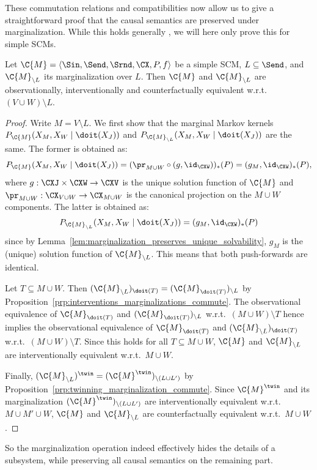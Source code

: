 These commutation relations and compatibilities now allow us to give a straightforward proof that
the causal semantics are preserved under marginalization.
While this holds generally \cite{BFPM21}, we will here only prove this for simple SCMs.
\begin{Thm}\label{Thm:various_equiv_marginalization}
  Let $\C{M} = \langle \Sin, \Send, \Srnd, \CX, P, f \rangle$ be a simple SCM, $L \subseteq \Send$, and
  $\C{M}_{\setminus L}$ its marginalization over $L$. Then $\C{M}$ and $\C{M}_{\setminus L}$ are observationally,
  interventionally and counterfactually equivalent w.r.t.\ $(V \cup W) \setminus L$.
\end{Thm}
\begin{proof}
  Write $M = V \setminus L$.
  We first show that the marginal Markov kernels $P_{\C{M}}(X_M,X_W \mid \doit(X_J))$ and $P_{\C{M}_{\setminus L}}(X_M,X_W \mid \doit(X_J))$ are the same.
  The former is obtained as:
  $$P_{\C{M}}(X_M,X_W \mid \doit(X_J)) = (\pr_{M\cup W} \circ (g,\id_{\CXW}))_*(P) = (g_{M},\id_{\CXW})_*(P),$$
  where $g : \CXJ \times \CXW \to \CXV$ is the unique solution function of $\C{M}$ and
  $\pr_{M\cup W} : \CX_{V \cup W} \to \CX_{M\cup W}$ is the canonical projection on the $M\cup W$ components. 
  The latter is obtained as:
  $$P_{\C{M}_{\setminus L}}(X_M,X_W \mid \doit(X_J)) = (g_M,\id_{\CXW})_*(P)$$
  since by Lemma~\ref{lem:marginalization_preserves_unique_solvability}, $g_M$ is the (unique) solution function of $\C{M}_{\setminus L}$.
  This means that both push-forwards are identical.

  Let $T \subseteq M \cup W$. Then $(\C{M}_{\setminus L})_{\doit(T)} = (\C{M}_{\doit(T)})_{\setminus L}$ by
  Proposition~\ref{prp:interventions_marginalizations_commute}. 
  The observational equivalence of $\C{M}_{\doit(T)}$ and $(\C{M}_{\doit(T)})_{\setminus L}$ w.r.t.\ $(M \cup W) \setminus T$ hence implies the observational equivalence of $\C{M}_{\doit(T)}$ and $(\C{M}_{\setminus L})_{\doit(T)}$ w.r.t.\ $(M \cup W) \setminus T$. 
  Since this holds for all $T \subseteq M \cup W$, $\C{M}$ and $\C{M}_{\setminus L}$ are interventionally equivalent w.r.t.\ $M \cup W$.

  Finally, $(\C{M}_{\setminus L})^\twin = (\C{M}^\twin)_{\setminus (L \cup L')}$ by Proposition~\ref{prp:twinning_marginalization_commute}. Since $\C{M}^\twin$ and its marginalization
  $(\C{M}^\twin)_{\setminus (L \cup L')}$ are interventionally equivalent w.r.t.\ $M \cup M' \cup W$, 
  $\C{M}$ and $\C{M}_{\setminus L}$ are counterfactually equivalent w.r.t.\ $M \cup W$.
\end{proof}
So the marginalization operation indeed effectively hides the details of a subsystem, while preserving all causal semantics on the remaining part.

